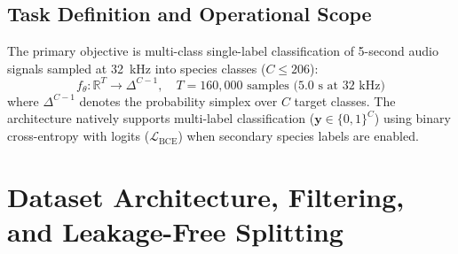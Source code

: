\documentclass[11pt,a4paper]{article}
\begin{document}
\subsection{Task Definition and Operational Scope}
The primary objective is multi-class single-label classification of 5-second audio signals sampled at 32~kHz into species classes ($C \le 206$):
\begin{equation}
    f_\theta: \mathbb{R}^{T} \to \Delta^{C-1}, \quad T = 160{,}000 \text{ samples (5.0 s at 32 kHz)}
\end{equation}
where $\Delta^{C-1}$ denotes the probability simplex over $C$ target classes. The architecture natively supports multi-label classification ($\mathbf{y} \in \{0, 1\}^C$) using binary cross-entropy with logits ($\mathcal{L}_{\text{BCE}}$) when secondary species labels are enabled.

\section{Dataset Architecture, Filtering, and Leakage-Free Splitting}
\end{document}
